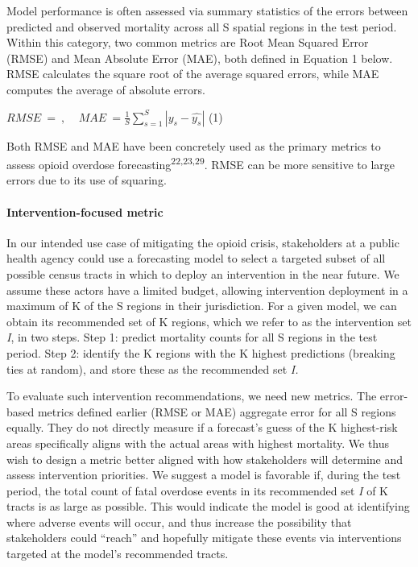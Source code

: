 Model performance is often assessed via summary statistics of the errors between predicted and observed mortality across all S spatial regions in the test period. Within this category, two common metrics are Root Mean Squared Error (RMSE) and Mean Absolute Error (MAE), both defined in Equation 1 below. RMSE calculates the square root of the average squared errors, while MAE computes the average of absolute errors.

\(RMSE\  = \ ,\ \ \ \ \ MAE\  = \frac{1}{S}\sum_{s = 1}^{S}|y_{s} - \widehat{y_{s}}|\) (1)

Both RMSE and MAE have been concretely used as the primary metrics to assess opioid overdose forecasting\textsuperscript{22,23,29}. RMSE can be more sensitive to large errors due to its use of squaring.

\paragraph{Intervention-focused metric}\label{intervention-focused-metric}

In our intended use case of mitigating the opioid crisis, stakeholders at a public health agency could use a forecasting model to select a targeted subset of all possible census tracts in which to deploy an intervention in the near future. We assume these actors have a limited budget, allowing intervention deployment in a maximum of K of the S regions in their jurisdiction. For a given model, we can obtain its recommended set of K regions, which we refer to as the intervention set \emph{I}, in two steps. Step 1: predict mortality counts for all S regions in the test period. Step 2: identify the K regions with the K highest predictions (breaking ties at random), and store these as the recommended set \emph{I.}

To evaluate such intervention recommendations, we need new metrics. The error-based metrics defined earlier (RMSE or MAE) aggregate error for all S regions equally. They do not directly measure if a forecast's guess of the K highest-risk areas specifically aligns with the actual areas with highest mortality. We thus wish to design a metric better aligned with how stakeholders will determine and assess intervention priorities. We suggest a model is favorable if, during the test period, the total count of fatal overdose events in its recommended set \emph{I} of K tracts is as large as possible. This would indicate the model is good at identifying where adverse events will occur, and thus increase the possibility that stakeholders could ``reach'' and hopefully mitigate these events via interventions targeted at the model's recommended tracts.

